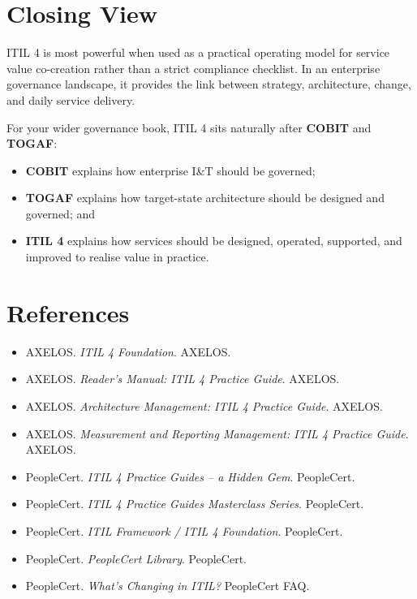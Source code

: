 \documentclass[
  letterpaper,
  DIV=11,
  numbers=noendperiod]{scrartcl}
\providecommand{\tightlist}{%
  \setlength{\itemsep}{0pt}\setlength{\parskip}{0pt}}
\begin{document}
\section{Closing View}\label{closing-view}

ITIL 4 is most powerful when used as a practical operating model for
service value co-creation rather than a strict compliance checklist. In
an enterprise governance landscape, it provides the link between
strategy, architecture, change, and daily service delivery.

For your wider governance book, ITIL 4 sits naturally after
\textbf{COBIT} and \textbf{TOGAF}:

\begin{itemize}
\tightlist
\item
  \textbf{COBIT} explains how enterprise I\&T should be governed;
\item
  \textbf{TOGAF} explains how target-state architecture should be
  designed and governed; and
\item
  \textbf{ITIL 4} explains how services should be designed, operated,
  supported, and improved to realise value in practice.
\end{itemize}

\section{References}\label{references}

\begin{itemize}
\tightlist
\item
  AXELOS. \emph{ITIL 4 Foundation}. AXELOS.
\item
  AXELOS. \emph{Reader's Manual: ITIL 4 Practice Guide}. AXELOS.
\item
  AXELOS. \emph{Architecture Management: ITIL 4 Practice Guide}. AXELOS.
\item
  AXELOS. \emph{Measurement and Reporting Management: ITIL 4 Practice
  Guide}. AXELOS.
\item
  PeopleCert. \emph{ITIL 4 Practice Guides -- a Hidden Gem}. PeopleCert.
\item
  PeopleCert. \emph{ITIL 4 Practice Guides Masterclass Series}.
  PeopleCert.
\item
  PeopleCert. \emph{ITIL Framework / ITIL 4 Foundation}. PeopleCert.
\item
  PeopleCert. \emph{PeopleCert Library}. PeopleCert.
\item
  PeopleCert. \emph{What's Changing in ITIL?} PeopleCert FAQ.
\end{itemize}
\end{document}
